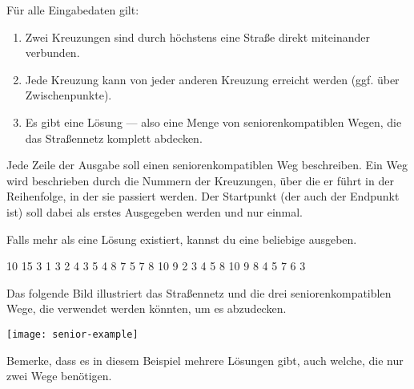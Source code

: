 \documentclass{boi2014-de}
\begin{document}
    Für alle Eingabedaten gilt:
    \begin{enumerate}
        \item Zwei Kreuzungen sind durch höchstens eine Straße direkt miteinander verbunden.
        \item Jede Kreuzung kann von jeder anderen Kreuzung erreicht werden (ggf. über Zwischenpunkte).
        \item Es gibt eine Lösung --- also eine Menge von seniorenkompatiblen Wegen, die das Straßennetz komplett abdecken.
    \end{enumerate}

    \Output
    Jede Zeile der Ausgabe soll einen seniorenkompatiblen Weg beschreiben.
    Ein Weg wird beschrieben durch die Nummern der Kreuzungen, über die er führt in der Reihenfolge, in der sie passiert werden.
    Der Startpunkt (der auch der Endpunkt ist) soll dabei als erstes Ausgegeben werden und nur einmal.
    
    Falls mehr als eine Lösung existiert, kannst du eine beliebige ausgeben.

    \Example

    \example
    {
        10 15  3  1 3  2 4  3 5  4 8  7  5 7  8  10  9
    }
    {
        2 3 4 5 8 10 9  8 4  5 7 6 3
    }
    {
        Das folgende Bild illustriert das Straßennetz und die drei seniorenkompatiblen Wege, die verwendet werden könnten, um es abzudecken.

        \texttt{[image: senior-example]}

        Bemerke, dass es in diesem Beispiel mehrere Lösungen gibt, auch welche, die nur zwei Wege benötigen.    
    }
\end{document}
